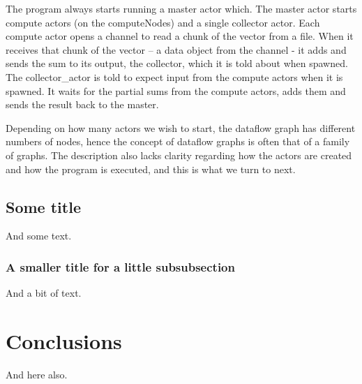 \documentclass[11pt,a4paper]{article}
\begin{document}
The program always starts running a master actor which. The master
actor starts compute actors (on the computeNodes) and a single
collector actor. Each compute actor opens a channel to read a chunk of
the vector from a file. When it receives that chunk of the vector – a
data object from the channel - it adds and sends the sum to its
output, the collector, which it is told about when spawned.  The
collector\_actor is told to expect input from the compute actors when
it is spawned. It waits for the partial sums from the compute actors,
adds them and sends the result back to the master.

Depending on how many actors we wish to start, the dataflow graph has
different numbers of nodes, hence the concept of dataflow graphs is
often that of a family of graphs.  The description also lacks clarity
regarding how the actors are created and how the program is executed,
and this is what we turn to next.





\subsection{Some title}

And some text.

\subsubsection{A smaller title for a little subsubsection}

And a bit of text.


\clearpage
\section{Conclusions}
\label{section:conclusions}

And here also.


\clearpage
{}
%
\end{document}
